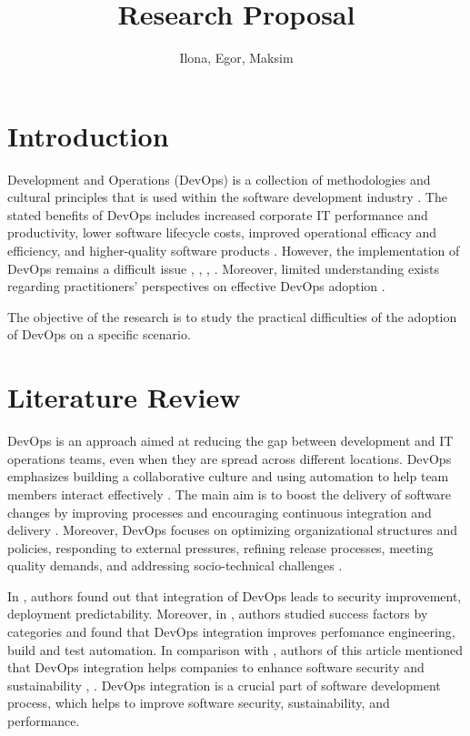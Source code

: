 \documentclass[oneside,final,12pt,a4paper]{extreport}
\title{Research Proposal}
\author{Ilona, Egor, Maksim}
\affil{Innopolis University}
\begin{document}
\maketitle

\newpage


\section{Introduction}

Development and Operations (DevOps) is a collection of methodologies and cultural principles that is used within the software development industry \cite{int1}. The stated benefits of DevOps includes increased corporate IT performance and productivity, lower software lifecycle costs, improved operational efficacy and efficiency, and higher-quality software products \cite{int1}. However, the implementation of DevOps remains a difficult issue \cite{int2}, \cite{8}, \cite{20}, \cite{14}. Moreover, limited understanding exists regarding practitioners' perspectives on effective DevOps adoption \cite{10}.

The objective of the research is to study the practical difficulties of the adoption of DevOps on a specific scenario.


\section{Literature Review}

DevOps is an approach aimed at reducing the gap between development and IT operations teams, even when they are spread across different locations. DevOps emphasizes building a collaborative culture and using automation to help team members interact effectively \cite{7}. The main aim is to boost the delivery of software changes by improving processes and encouraging continuous integration and delivery \cite{11}. Moreover, DevOps focuses on optimizing organizational structures and policies, responding to external pressures, refining release processes, meeting quality demands, and addressing socio-technical challenges \cite{7}.

In \cite{7}, authors found out that integration of DevOps leads to security improvement, deployment predictability. Moreover, in \cite{9}, authors studied success factors by categories and found that DevOps integration improves perfomance engineering, build and test automation. In comparison with \cite{9}, authors of this article mentioned that DevOps integration helps companies to enhance software security and sustainability \cite{12}, \cite{18}. DevOps integration is a crucial part of software development process, which helps to improve software security, sustainability, and performance.
\end{document}
